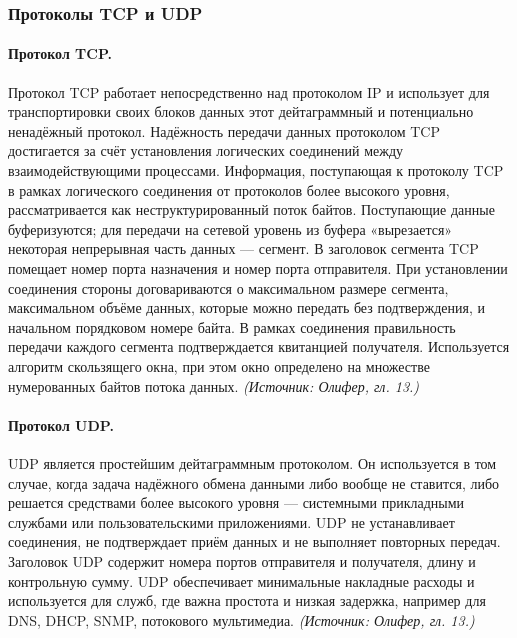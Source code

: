 \documentclass[a4paper,12pt]{article}
\begin{document}
\subsubsection{Протоколы TCP и UDP}

\paragraph{Протокол TCP.}
Протокол TCP работает непосредственно над протоколом IP и использует для транспортировки своих блоков данных этот дейтаграммный и потенциально ненадёжный протокол. Надёжность передачи данных протоколом TCP достигается за счёт установления логических соединений между взаимодействующими процессами. Информация, поступающая к протоколу TCP в рамках логического соединения от протоколов более высокого уровня, рассматривается как неструктурированный поток байтов. Поступающие данные буферизуются; для передачи на сетевой уровень из буфера «вырезается» некоторая непрерывная часть данных — сегмент. В заголовок сегмента TCP помещает номер порта назначения и номер порта отправителя. При установлении соединения стороны договариваются о максимальном размере сегмента, максимальном объёме данных, которые можно передать без подтверждения, и начальном порядковом номере байта. В рамках соединения правильность передачи каждого сегмента подтверждается квитанцией получателя. Используется алгоритм скользящего окна, при этом окно определено на множестве нумерованных байтов потока данных.
\textit{(Источник: Олифер, гл. 13.)}

\paragraph{Протокол UDP.}
UDP является простейшим дейтаграммным протоколом. Он используется в том случае, когда задача надёжного обмена данными либо вообще не ставится, либо решается средствами более высокого уровня — системными прикладными службами или пользовательскими приложениями. UDP не устанавливает соединения, не подтверждает приём данных и не выполняет повторных передач. Заголовок UDP содержит номера портов отправителя и получателя, длину и контрольную сумму. UDP обеспечивает минимальные накладные расходы и используется для служб, где важна простота и низкая задержка, например для DNS, DHCP, SNMP, потокового мультимедиа.
\textit{(Источник: Олифер, гл. 13.)}
\end{document}
